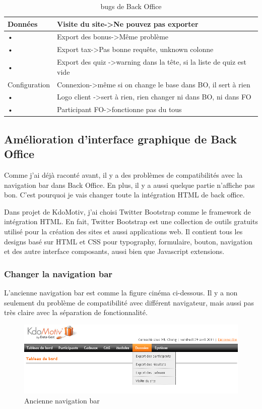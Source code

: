 \begin{table}[htbp]
\begin{tabularx}{\textwidth}{lX}
 \\ 
\hline 
Données
 & Visite du site-\textgreater Ne pouvez pas exporter
 \\ 
\hline 
• & Export des bonus-\textgreater Même problème
 \\ 
\hline 
• & Export tax-\textgreater Pas bonne requête, unknown colonne
 \\ 
\hline 
• & Export des quiz -\textgreater warning dans la tête, si la liste de quiz est vide
 \\ 
\hline 
Configuration
 & Connexion-\textgreater même si on change le base dans BO, il sert à rien
 \\ 
\hline 
• & Logo client -\textgreater sert à rien, rien changer ni dans BO, ni dans FO
 \\ 
\hline 
• & Participant FO-\textgreater fonctionne pas du tous
 \\ 
\hline 
\end{tabularx} 
 \caption{bugs de Back Office}
\end{table}  


\newpage

\subsection{Amélioration d'interface graphique de Back Office}
Comme j'ai déjà raconté avant, il y a des problèmes de compatibilités avec la navigation bar dans Back Office. En plus, il y a aussi quelque partie n'affiche pas bon. C'est pourquoi je vais changer toute la intégration HTML de back office.

Dans projet de KdoMotiv, j'ai choisi Twitter Bootstrap comme le framework de intégration HTML. En fait, Twitter Bootstrap est une collection de outils gratuits utilisé pour la création des sites et aussi applications web. Il contient tous les designs basé sur HTML et CSS pour typography, formulaire, bouton, navigation et des autre interface composants, aussi bien que Javascript extensions.

\subsubsection{Changer la navigation bar}
L'ancienne navigation bar est comme la figure cinéma ci-dessous. Il y a non seulement du problème de compatibilité avec différent navigateur, mais aussi pas très claire avec la séparation de fonctionnalité.
\begin{figure}[hbtp]
\centering
\includegraphics[width=15cm]{body/images/navbar-old.png}
\caption{Ancienne navigation bar}
\end{figure}


